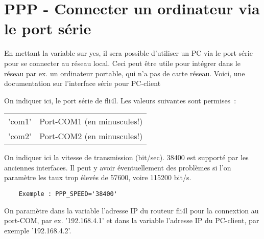 
{
\section {PPP - Connecter un ordinateur via le port série}
}

    En mettant la variable  sur yes, il sera
    possible d'utiliser un PC via le port série pour se connecter au réseau local.
    Ceci peut être utile pour intégrer dans le réseau par ex. un ordinateur
    portable, qui n'a pas de carte réseau. Voici, une documentation sur
    l'interface série pour PC-client

\begin{description}

        On indiquer ici, le port série de fli4l. Les valeurs suivantes
        sont permises~:

        \begin{tabular}[h]{l l}
          'com1' &           Port-COM1 (en minuscules!) \\
          'com2' &           Port-COM2 (en minuscules!) \\
        \end{tabular}


        On indiquer ici la vitesse de transmission (bit/sec). 38400 est
        supporté par les anciennes interfaces. Il peut y avoir éventuellement
        des problèmes si l'on paramètre les taux trop élevés de 57600, voire 115200 bit/s.

\begin{example}
\begin{verbatim}
    Exemple : PPP_SPEED='38400'
\end{verbatim}
\end{example}




        On paramètre dans la variable  l'adresse IP
        du routeur fli4l pour la connextion au port-COM, par ex. '192.168.4.1'
        et dans la variable  l'adresse IP du PC-client,
        par exemple '192.168.4.2'.




\end{description}
